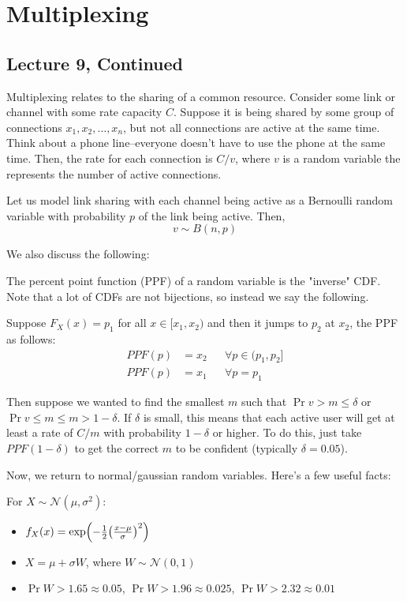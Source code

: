 \section{Multiplexing}

\subsection{Lecture 9, Continued}
Multiplexing relates to the sharing of a common resource. Consider some link or channel with some rate capacity $C$. Suppose it is
being shared by some group of connections $x_1, x_2, \dots, x_n$, but not all connections are active at the same time. Think
about a phone line--everyone doesn't have to use the phone at the same time. Then, the rate for each connection is
$C/v$, where $v$ is a random variable the represents the number of active connections.

Let us model link sharing with each channel being active as a Bernoulli random variable with probability $p$
of the link being active. Then,
\[ v \sim B(n, p) \]

We also discuss the following:
\begin{definition}[PPF]
    The percent point function (PPF) of a random variable is the "inverse" CDF. Note that a lot of CDFs are
    not bijections, so instead we say the following.

    Suppose $F_X(x) = p_1$ for all $x \in [x_1, x_2)$ and then it jumps to $p_2$ at $x_2$, the
    PPF as follows:
    \begin{align*}
        PPF(p) &= x_2 && \forall p \in (p_1, p_2] \\
        PPF(p) &= x_1 && \forall p = p_1
    \end{align*}
\end{definition}

Then suppose we wanted to find the smallest $m$ such that $\Pr{v > m} \leq \delta$ or $\Pr{v \leq m} \leq m > 1 - \delta$.
If $\delta$ is small, this means that each active user will get at least
a rate of $C/m$ with probability $1 - \delta$ or higher. To do this,
just take $PPF(1 - \delta)$ to get the correct $m$ to be confident (typically $\delta = 0.05$).

Now, we return to normal/gaussian random variables. Here's a few useful facts:

\begin{note}
    For $X \sim \mathcal{N}(\mu, \sigma^2)$:
    \begin{itemize}
        \item $f_X(x) = \exp(-\frac{1}{2}\qty(\frac{x - \mu}{\sigma})^2)$
        \item $X = \mu + \sigma W$, where $W \sim \mathcal{N}(0, 1)$
        \item $\Pr{W > 1.65} \approx 0.05$, $\Pr{W > 1.96} \approx 0.025$, $\Pr{W > 2.32} \approx 0.01$
    \end{itemize}
\end{note}